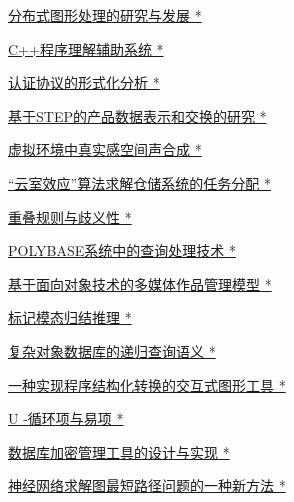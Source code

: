 \documentclass[a4paper]{article}
\begin{document}
\href{http://www.jos.org.cn/ch/reader/download_pdf.aspx?file_no=1996s113&year_id=1996&quarter_id=zk&falg=1}{分布式图形处理的研究与发展 *}

\href{http://www.jos.org.cn/ch/reader/download_pdf.aspx?file_no=1996s114&year_id=1996&quarter_id=zk&falg=1}{C++程序理解辅助系统 *}

\href{http://www.jos.org.cn/ch/reader/download_pdf.aspx?file_no=1996s115&year_id=1996&quarter_id=zk&falg=1}{认证协议的形式化分析 *}

\href{http://www.jos.org.cn/ch/reader/download_pdf.aspx?file_no=1996s116&year_id=1996&quarter_id=zk&falg=1}{基于STEP的产品数据表示和交换的研究 *}

\href{http://www.jos.org.cn/ch/reader/download_pdf.aspx?file_no=1996s117&year_id=1996&quarter_id=zk&falg=1}{虚拟环境中真实感空间声合成 *}

\href{http://www.jos.org.cn/ch/reader/download_pdf.aspx?file_no=1996s118&year_id=1996&quarter_id=zk&falg=1}{“云室效应”算法求解仓储系统的任务分配 *}

\href{http://www.jos.org.cn/ch/reader/download_pdf.aspx?file_no=1996s119&year_id=1996&quarter_id=zk&falg=1}{重叠规则与歧义性 *}

\href{http://www.jos.org.cn/ch/reader/download_pdf.aspx?file_no=1996s120&year_id=1996&quarter_id=zk&falg=1}{POLYBASE系统中的查询处理技术 *}

\href{http://www.jos.org.cn/ch/reader/download_pdf.aspx?file_no=1996s121&year_id=1996&quarter_id=zk&falg=1}{基于面向对象技术的多媒体作品管理模型 *}

\href{http://www.jos.org.cn/ch/reader/download_pdf.aspx?file_no=1996s122&year_id=1996&quarter_id=zk&falg=1}{标记模态归结推理 *}

\href{http://www.jos.org.cn/ch/reader/download_pdf.aspx?file_no=1996s123&year_id=1996&quarter_id=zk&falg=1}{复杂对象数据库的递归查询语义 *}

\href{http://www.jos.org.cn/ch/reader/download_pdf.aspx?file_no=1996s124&year_id=1996&quarter_id=zk&falg=1}{一种实现程序结构化转换的交互式图形工具 *}

\href{http://www.jos.org.cn/ch/reader/download_pdf.aspx?file_no=1996s125&year_id=1996&quarter_id=zk&falg=1}{U -循环项与易项 *}

\href{http://www.jos.org.cn/ch/reader/download_pdf.aspx?file_no=1996s126&year_id=1996&quarter_id=zk&falg=1}{数据库加密管理工具的设计与实现 *}

\href{http://www.jos.org.cn/ch/reader/download_pdf.aspx?file_no=1996s127&year_id=1996&quarter_id=zk&falg=1}{神经网络求解图最短路径问题的一种新方法 *}
\end{document}
